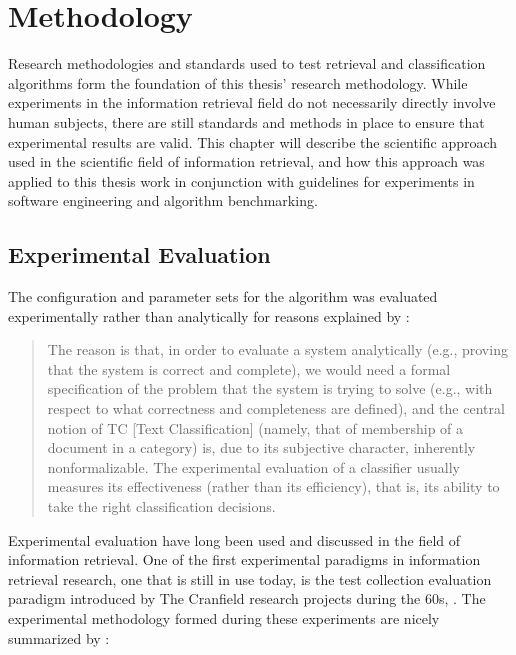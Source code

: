 
\chapter{Methodology} %

\label{Methodology} %


Research methodologies and standards used to test retrieval and classification algorithms form the foundation of this thesis' research methodology. While experiments in the information retrieval field do not necessarily directly involve human subjects, there are still standards and methods in place to ensure that experimental results are valid. This chapter will describe the scientific approach used in the scientific field of information retrieval, and how this approach was applied to this thesis work in conjunction with guidelines for experiments in software engineering and algorithm benchmarking.

\section{Experimental Evaluation}
\label{ExperimentalEvaluation}
The configuration and parameter sets for the \CTC algorithm was evaluated experimentally rather than analytically for reasons explained by \cite[][32]{Sebastiani2002}:
\begin{quote}The reason is that, in order to evaluate a system analytically (e.g., proving that the system is correct and complete), we would need a formal specification of the problem that the system is trying to solve (e.g., with respect to what correctness and completeness are defined), and the central notion of TC [Text Classification] (namely, that of membership of a document in a category) is, due to its subjective character, inherently nonformalizable. The experimental evaluation of a classifier usually measures its effectiveness (rather than its efficiency), that is, its ability to take the right classification decisions.
\end{quote}

Experimental evaluation have long been used and discussed in the field of information retrieval. One of the first experimental paradigms in information retrieval research, one that is still in use today, is the test collection evaluation paradigm introduced by The Cranfield research projects during the 60s, \parencite{Cleverdon1966}. The experimental methodology formed during these experiments are nicely summarized by \cite[][564]{Voorhees2005}:

